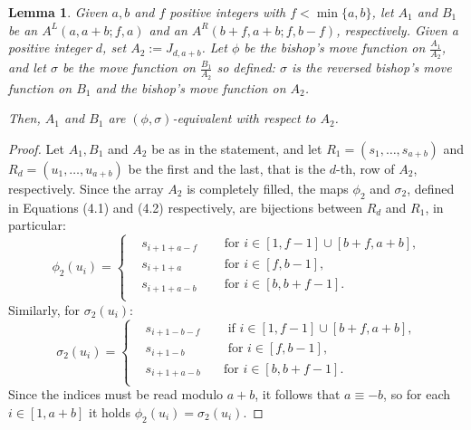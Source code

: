 \documentclass{amsart}
\newtheorem{lem}[prop]{Lemma}
\theoremstyle{definition}
\numberwithin{equation}{section}
\begin{document}
\begin{lem}\label{lem:equiv_holed}
Given $a, b$ and $f$ positive integers with $f<\min\{a,b\}$,
let $A_1$ and $B_1$ be an $A^{L}(a,a+b;f,a)$ and an $A^{R}(b+f,a+b;f,b-f)$, respectively. Given a positive integer $d$, set $A_2:=J_{d,a+b}$. Let $\phi$ be the bishop's move function on $\frac{A_1}{A_2}$, and let $\sigma$ be the move function on $\frac{B_1}{A_2}$ so defined: $\sigma$ is the reversed bishop's move function on $B_1$ and the bishop's move function on $A_2$.
 
Then, $A_1$ and $B_1$ are $(\phi,\sigma)$-equivalent with respect to $A_2$.  
\end{lem}
\begin{proof}
Let $A_1, B_1$ and $A_2$ be as in the statement, and let $R_1=(s_1,\dotsc,s_{a+b})$ and $R_d=(u_1,\dotsc,u_{a+b})$ be the first and the last, that is the $d$-th, row of $A_2$, respectively. Since the array $A_2$ is completely filled, the maps $\phi_2$ and $\sigma_2$, defined in Equations (4.1) and (4.2) respectively, are bijections between $R_d$ and $R_1$, in particular:
\[
\phi_2(u_i) = \left\{
\begin{aligned}
	&s_{i+1+a-f}  \quad &\text{ for  $i \in [1, f-1] \cup[b+f, a+b] $,} \\
    	&s_{i+1+a}\quad &\text{  for $i \in [ f, b-1] $, } \\
	&s_{i+1+a-b} \quad&\text{ for $i \in [ b, b+f-1] $.} \\
\end{aligned}
\right.
\]
Similarly, for $\sigma_2(u_i)$:
\[
\sigma_2(u_i) = \left\{
\begin{aligned}
	&s_{i+1-b-f}  \quad &\text{ if $i \in [1, f-1] \cup[b+f, a+b] $,} \\
	&s_{i+1-b} \quad&\text{ for $i \in [ f, b-1] $,} \\
	&s_{i+1+a-b}\quad &\text{for $i \in [ b, b+f-1] $.} \\
\end{aligned}
\right.
\]
Since the indices must be read modulo $a+b$, it follows that $a \equiv -b$, so for each $i \in [1,a+b]$ it holds $\phi_2(u_i) = \sigma_2(u_i)$. 
\end{proof}
\end{document}
